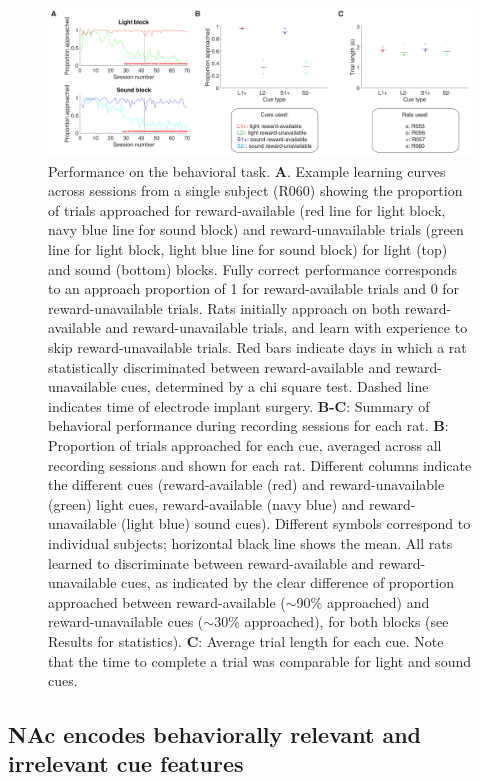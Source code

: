 \documentclass[11pt]{article}
\newcommand{\bsf}[1]{\textbf{#1}}
\providecommand{\DIFadd}[1]{{\protect\color{red} \sf #1}} %
\providecommand{\DIFdel}[1]{} %
\providecommand{\DIFaddbegin}{} %
\providecommand{\DIFaddend}{} %
\providecommand{\DIFdelbegin}{} %
\providecommand{\DIFdelend}{} %
\newcommand{\DIFscaledelfig}{0.5}
\newlength{\DIFdelgraphicswidth} %
\newlength{\DIFdelgraphicsheight} %
\newcommand{\DIFaddincludegraphics}[2][]{{\color{red}\fbox{\DIFOincludegraphics[#1]{#2}}}} %
\newcommand{\DIFdelincludegraphics}[2][]{%
\sbox{\DIFdelgraphicsbox}{\DIFOincludegraphics[#1]{#2}}%
\settoboxwidth{\DIFdelgraphicswidth}{\DIFdelgraphicsbox} %
\settoboxtotalheight{\DIFdelgraphicsheight}{\DIFdelgraphicsbox} %
\scalebox{\DIFscaledelfig}{%
\parbox[b]{\DIFdelgraphicswidth}{\usebox{\DIFdelgraphicsbox}\\[-\baselineskip] \rule{\DIFdelgraphicswidth}{0em}}\llap{\resizebox{\DIFdelgraphicswidth}{\DIFdelgraphicsheight}{%
\setlength{\unitlength}{\DIFdelgraphicswidth}%
\begin{picture}(1,1)%
\thicklines\linethickness{2pt} %
{\color[rgb]{1,0,0}\put(0,0){\framebox(1,1){}}}%
{\color[rgb]{1,0,0}\put(0,0){\line( 1,1){1}}}%
{\color[rgb]{1,0,0}\put(0,1){\line(1,-1){1}}}%
\end{picture}%
}\hspace*{3pt}}} %
} %
\DeclareRobustCommand{\DIFaddbegin}{\DIFOaddbegin \let\includegraphics\DIFaddincludegraphics} %
\DeclareRobustCommand{\DIFaddend}{\DIFOaddend \let\includegraphics\DIFOincludegraphics} %
\DeclareRobustCommand{\DIFdelbegin}{\DIFOdelbegin \let\includegraphics\DIFdelincludegraphics} %
\DeclareRobustCommand{\DIFdelend}{\DIFOaddend \let\includegraphics\DIFOincludegraphics} %
\begin{document}
 \begin{figure}[ht!]
\centering
\includegraphics[width=\textwidth]{Fig 3 - Behavioral results.pdf}
\caption{Performance on the behavioral task. \bsf{A}. Example learning
  curves across sessions from a single subject (R060) showing the
  proportion of trials approached for reward-available (red line for light
  block, navy blue line for sound block) and reward-unavailable trials
  (green line for light block, light blue line for sound block) for
  light (top) and sound (bottom) blocks. Fully correct performance
  corresponds to an approach proportion of 1 for reward-available
  trials and 0 for reward-unavailable trials. Rats initially approach
  on both reward-available and reward-unavailable trials, and learn
  with experience to skip reward-unavailable trials. Red bars indicate days
  in which a rat statistically discriminated between reward-available
  and reward-unavailable cues, determined by a chi square test. Dashed
  line indicates time of electrode implant surgery. \bsf{B-C}: Summary
  of behavioral performance during recording sessions for each rat. \bsf{B}:
  Proportion of trials approached for each cue, averaged across all recording
  sessions and shown for each rat. Different columns indicate the different cues
  (reward-available (red) and reward-unavailable (green) light cues,
  reward-available (navy blue) and reward-unavailable (light blue)
  sound cues). Different symbols correspond to individual subjects;
  horizontal black line shows the mean. All rats learned to
  discriminate between reward-available and reward-unavailable cues,
  as indicated by the clear difference of proportion approached
  between reward-available ($\sim$90\% approached) and
  reward-unavailable cues ($\sim$30\% approached), for both blocks
  (see Results for statistics). \bsf{C}: Average trial length for each
  cue. Note that the time to complete a trial was comparable for light and sound cues.}
\label{fig:behav}
\end{figure} \clearpage

\subsection*{NAc \DIFdelbegin \DIFdel{units encode }\DIFdelend \DIFaddbegin \DIFadd{encodes }\DIFaddend behaviorally relevant and irrelevant cue features}
\end{document}
